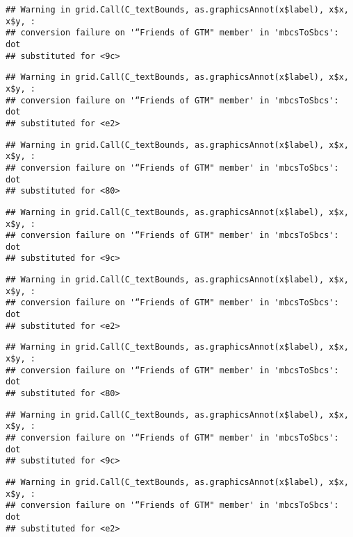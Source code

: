 \documentclass[
]{article}
\begin{document}
\begin{verbatim}
## Warning in grid.Call(C_textBounds, as.graphicsAnnot(x$label), x$x, x$y, :
## conversion failure on '“Friends of GTM" member' in 'mbcsToSbcs': dot
## substituted for <9c>
\end{verbatim}

\begin{verbatim}
## Warning in grid.Call(C_textBounds, as.graphicsAnnot(x$label), x$x, x$y, :
## conversion failure on '“Friends of GTM" member' in 'mbcsToSbcs': dot
## substituted for <e2>
\end{verbatim}

\begin{verbatim}
## Warning in grid.Call(C_textBounds, as.graphicsAnnot(x$label), x$x, x$y, :
## conversion failure on '“Friends of GTM" member' in 'mbcsToSbcs': dot
## substituted for <80>
\end{verbatim}

\begin{verbatim}
## Warning in grid.Call(C_textBounds, as.graphicsAnnot(x$label), x$x, x$y, :
## conversion failure on '“Friends of GTM" member' in 'mbcsToSbcs': dot
## substituted for <9c>
\end{verbatim}

\begin{verbatim}
## Warning in grid.Call(C_textBounds, as.graphicsAnnot(x$label), x$x, x$y, :
## conversion failure on '“Friends of GTM" member' in 'mbcsToSbcs': dot
## substituted for <e2>
\end{verbatim}

\begin{verbatim}
## Warning in grid.Call(C_textBounds, as.graphicsAnnot(x$label), x$x, x$y, :
## conversion failure on '“Friends of GTM" member' in 'mbcsToSbcs': dot
## substituted for <80>
\end{verbatim}

\begin{verbatim}
## Warning in grid.Call(C_textBounds, as.graphicsAnnot(x$label), x$x, x$y, :
## conversion failure on '“Friends of GTM" member' in 'mbcsToSbcs': dot
## substituted for <9c>
\end{verbatim}

\begin{verbatim}
## Warning in grid.Call(C_textBounds, as.graphicsAnnot(x$label), x$x, x$y, :
## conversion failure on '“Friends of GTM" member' in 'mbcsToSbcs': dot
## substituted for <e2>
\end{verbatim}
\end{document}
